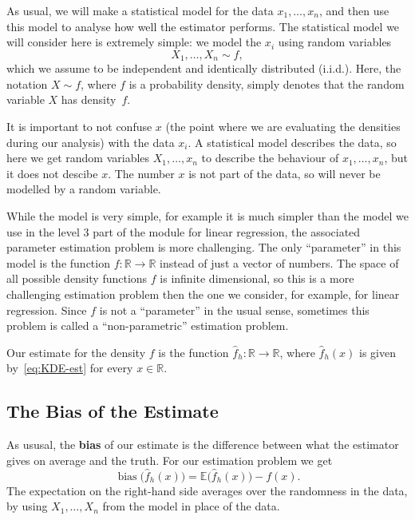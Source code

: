 \documentclass[
  a4paper,
]{article}
\theoremstyle{definition}
\theoremstyle{definition}
\theoremstyle{definition}
\theoremstyle{definition}
\theoremstyle{remark}
\begin{document}
As usual, we will make a statistical model for the data \(x_1, \ldots, x_n\),
and then use this model to analyse how well the estimator performs.
The statistical model we will consider here is extremely simple: we
model the \(x_i\) using random variables
\begin{equation}
  X_1, \ldots, X_n \sim f,  \label{eq:KDE-model}
\end{equation}
which we assume to be independent and identically distributed (i.i.d.).
Here, the notation \(X \sim f\), where \(f\) is a probability density, simply
denotes that the random variable \(X\) has density~\(f\).

It is important to not confuse \(x\) (the point where we are evaluating
the densities during our analysis) with the data \(x_i\). A statistical
model describes the data, so here we get random variables \(X_1, \ldots, x_n\)
to describe the behaviour of \(x_1, \ldots, x_n\), but it does not descibe \(x\).
The number \(x\) is not part of the data, so will never be modelled by a
random variable.

While the model is very simple, for example it is much simpler than the
model we use in the level 3 part of the module for linear regression,
the associated parameter estimation problem is more challenging.
The only ``parameter'' in this model is the function \(f \colon\mathbb{R}\to \mathbb{R}\)
instead of just a vector of numbers. The space of all possible density
functions \(f\) is infinite dimensional, so this is a more challenging
estimation problem then the one we consider, for example, for linear
regression. Since \(f\) is not a ``parameter'' in the usual sense, sometimes
this problem is called a ``non-parametric'' estimation problem.

Our estimate for the density \(f\) is the function \(\hat f_h\colon \mathbb{R}\to \mathbb{R}\),
where \(\hat f_h(x)\) is given by~\eqref{eq:KDE-est} for every \(x \in\mathbb{R}\).

\subsection{The Bias of the Estimate}\label{the-bias-of-the-estimate}

As ususal, the \textbf{bias} of our estimate is the difference between
what the estimator gives on average and the truth. For our estimation
problem we get
\begin{equation*}
    \mathop{\mathrm{bias}}\bigl(\hat f_h(x)\bigr)
    = \mathbb{E}\bigl(\hat f_h(x)\bigr) - f(x).
\end{equation*}
The expectation on the right-hand side averages over the randomness
in the data, by using \(X_1, \ldots, X_n\) from the model in place of
the data.
\end{document}
